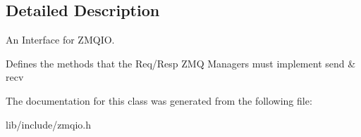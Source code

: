 \subsection{Detailed Description}
An Interface for Z\-M\-Q\-I\-O. 

Defines the methods that the Req/\-Resp Z\-M\-Q Managers must implement send \& recv 

The documentation for this class was generated from the following file\-:\begin{DoxyCompactItemize}
\item 
lib/include/zmqio.\-h\end{DoxyCompactItemize}
